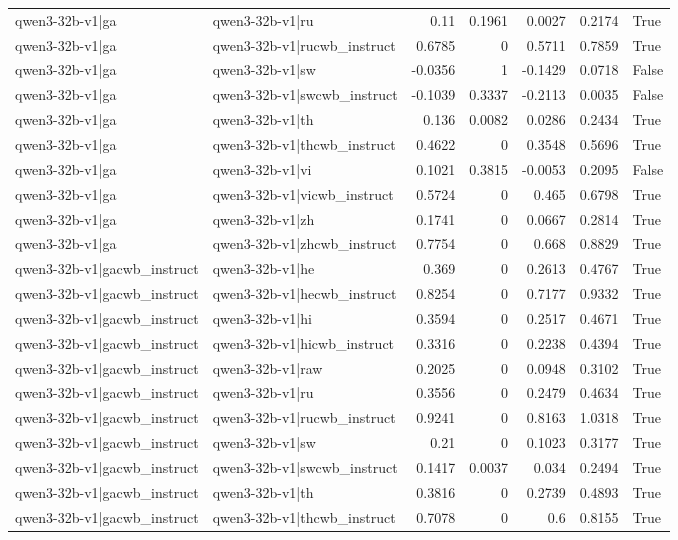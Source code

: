 \begin{table}
\begin{tabular}{l l r r r r l}
qwen3-32b-v1|ga & qwen3-32b-v1|ru & 0.11 & 0.1961 & 0.0027 & 0.2174 & True \\
qwen3-32b-v1|ga & qwen3-32b-v1|rucwb_instruct & 0.6785 & 0 & 0.5711 & 0.7859 & True \\
qwen3-32b-v1|ga & qwen3-32b-v1|sw & -0.0356 & 1 & -0.1429 & 0.0718 & False \\
qwen3-32b-v1|ga & qwen3-32b-v1|swcwb_instruct & -0.1039 & 0.3337 & -0.2113 & 0.0035 & False \\
qwen3-32b-v1|ga & qwen3-32b-v1|th & 0.136 & 0.0082 & 0.0286 & 0.2434 & True \\
qwen3-32b-v1|ga & qwen3-32b-v1|thcwb_instruct & 0.4622 & 0 & 0.3548 & 0.5696 & True \\
qwen3-32b-v1|ga & qwen3-32b-v1|vi & 0.1021 & 0.3815 & -0.0053 & 0.2095 & False \\
qwen3-32b-v1|ga & qwen3-32b-v1|vicwb_instruct & 0.5724 & 0 & 0.465 & 0.6798 & True \\
qwen3-32b-v1|ga & qwen3-32b-v1|zh & 0.1741 & 0 & 0.0667 & 0.2814 & True \\
qwen3-32b-v1|ga & qwen3-32b-v1|zhcwb_instruct & 0.7754 & 0 & 0.668 & 0.8829 & True \\
qwen3-32b-v1|gacwb_instruct & qwen3-32b-v1|he & 0.369 & 0 & 0.2613 & 0.4767 & True \\
qwen3-32b-v1|gacwb_instruct & qwen3-32b-v1|hecwb_instruct & 0.8254 & 0 & 0.7177 & 0.9332 & True \\
qwen3-32b-v1|gacwb_instruct & qwen3-32b-v1|hi & 0.3594 & 0 & 0.2517 & 0.4671 & True \\
qwen3-32b-v1|gacwb_instruct & qwen3-32b-v1|hicwb_instruct & 0.3316 & 0 & 0.2238 & 0.4394 & True \\
qwen3-32b-v1|gacwb_instruct & qwen3-32b-v1|raw & 0.2025 & 0 & 0.0948 & 0.3102 & True \\
qwen3-32b-v1|gacwb_instruct & qwen3-32b-v1|ru & 0.3556 & 0 & 0.2479 & 0.4634 & True \\
qwen3-32b-v1|gacwb_instruct & qwen3-32b-v1|rucwb_instruct & 0.9241 & 0 & 0.8163 & 1.0318 & True \\
qwen3-32b-v1|gacwb_instruct & qwen3-32b-v1|sw & 0.21 & 0 & 0.1023 & 0.3177 & True \\
qwen3-32b-v1|gacwb_instruct & qwen3-32b-v1|swcwb_instruct & 0.1417 & 0.0037 & 0.034 & 0.2494 & True \\
qwen3-32b-v1|gacwb_instruct & qwen3-32b-v1|th & 0.3816 & 0 & 0.2739 & 0.4893 & True \\
qwen3-32b-v1|gacwb_instruct & qwen3-32b-v1|thcwb_instruct & 0.7078 & 0 & 0.6 & 0.8155 & True \\

\end{tabular}
\end{table}
